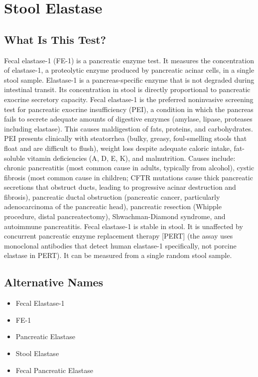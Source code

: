 \chapter{Stool Elastase}
\section*{What Is This Test?}
Fecal elastase-1 (FE-1) is a pancreatic enzyme test. It measures the concentration of elastase-1, a proteolytic enzyme produced by pancreatic acinar cells, in a single stool sample. Elastase-1 is a pancreas-specific enzyme that is not degraded during intestinal transit. Its concentration in stool is directly proportional to pancreatic exocrine secretory capacity. Fecal elastase-1 is the preferred noninvasive screening test for pancreatic exocrine insufficiency (PEI), a condition in which the pancreas fails to secrete adequate amounts of digestive enzymes (amylase, lipase, proteases including elastase). This causes maldigestion of fats, proteins, and carbohydrates. PEI presents clinically with steatorrhea (bulky, greasy, foul-smelling stools that float and are difficult to flush), weight loss despite adequate caloric intake, fat-soluble vitamin deficiencies (A, D, E, K), and malnutrition. Causes include: chronic pancreatitis (most common cause in adults, typically from alcohol), cystic fibrosis (most common cause in children; CFTR mutations cause thick pancreatic secretions that obstruct ducts, leading to progressive acinar destruction and fibrosis), pancreatic ductal obstruction (pancreatic cancer, particularly adenocarcinoma of the pancreatic head), pancreatic resection (Whipple procedure, distal pancreatectomy), Shwachman-Diamond syndrome, and autoimmune pancreatitis. Fecal elastase-1 is stable in stool. It is unaffected by concurrent pancreatic enzyme replacement therapy [PERT] (the assay uses monoclonal antibodies that detect human elastase-1 specifically, not porcine elastase in PERT). It can be measured from a single random stool sample.
\section*{Alternative Names}
\begin{itemize}
  \item Fecal Elastase-1
  \item FE-1
  \item Pancreatic Elastase
  \item Stool Elastase
  \item Fecal Pancreatic Elastase
\end{itemize}
